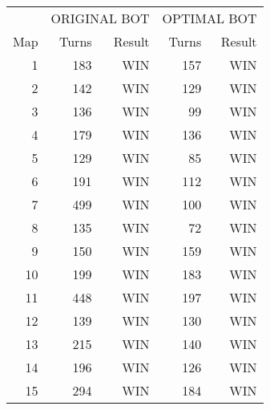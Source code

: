 \begin{tabular}{rrrrr}

           & \multicolumn{ 2}{c}{ORIGINAL BOT} & \multicolumn{ 2}{c}{OPTIMAL BOT} \\

       Map &      Turns &     Result &      Turns &     Result \\

         1 &        183 &        WIN &        157 &        WIN \\

         2 &        142 &        WIN &        129 &        WIN \\

         3 &        136 &        WIN &         99 &        WIN \\

         4 &        179 &        WIN &        136 &        WIN \\

         5 &        129 &        WIN &         85 &        WIN \\

         6 &        191 &        WIN &        112 &        WIN \\

         7 &        499 &        WIN &        100 &        WIN \\

         8 &        135 &        WIN &         72 &        WIN \\

         9 &        150 &        WIN &        159 &        WIN \\

        10 &        199 &        WIN &        183 &        WIN \\

        11 &        448 &        WIN &        197 &        WIN \\

        12 &        139 &        WIN &        130 &        WIN \\

        13 &        215 &        WIN &        140 &        WIN \\

        14 &        196 &        WIN &        126 &        WIN \\

        15 &        294 &        WIN &        184 &        WIN \\


\end{tabular}
